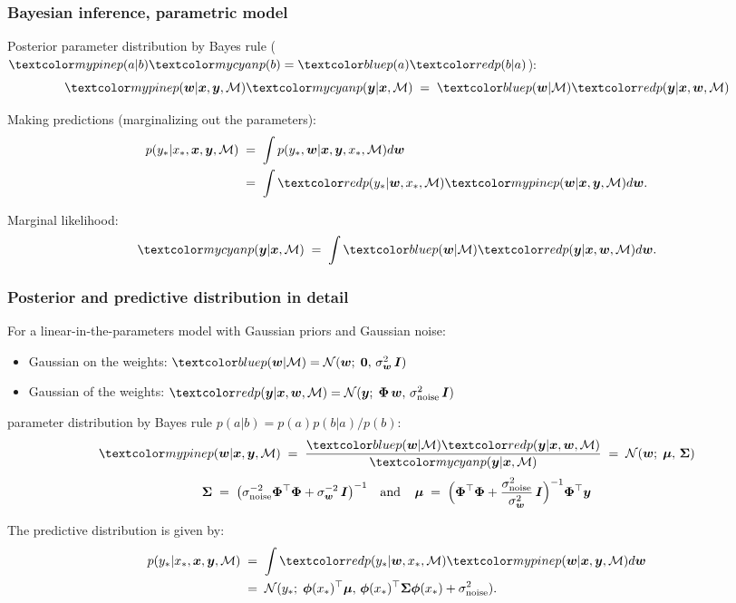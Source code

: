 \begin{frame}
\frametitle{Bayesian inference, parametric model}

Posterior parameter distribution by Bayes rule ($\Green{p(a|b)}\Cyan{p(b)}=\Blue{p(a)} \Red{p(b|a)}$):
\[
\Green{p(\bfw|\bfx,\bfy,\mathcal{M})}\Cyan{p(\bfy|\bfx,\mathcal{M})}
\;=\;\Blue{p(\bfw|\mathcal{M})}\Red{p(\bfy|\bfx,\bfw,\mathcal{M})}
\]

Making predictions (marginalizing out the parameters):
\[
\begin{split}
p(y_*|x_*,\bfx, \bfy,\mathcal{M})\;&=\;
\int p(y_*,\bfw|\bfx, \bfy, x_*, \mathcal{M})d\bfw\\
&=\;\int \Red{p(y_*|\bfw,x_*,\mathcal{M})}\Green{p(\bfw|\bfx,\bfy,\mathcal{M})}d\bfw.
\end{split}
\]

Marginal likelihood:
\[
\Cyan{p(\bfy|\bfx,\mathcal{M})}\;=\;
\int \Blue{p(\bfw|\mathcal{M})}  \Red{p(\bfy|\bfx,\bfw,\mathcal{M})}  d\bfw.
\]
\end{frame}


\begin{frame}
\frametitle{Posterior and predictive distribution in detail}

For a linear-in-the-parameters model with Gaussian priors and Gaussian noise:
\begin{itemize}
\item Gaussian  on the weights: 
$\Blue{p(\bfw|\mathcal{M})}=\N(\bfw;\;\mathbf{0},\,\sigma_{\bm w}^2\,\bfI)$
\item Gaussian  of the weights:
$\Red{p(\bfy|\bfx,\bfw,\mathcal{M}})=\N(\bfy;\;\bPhi\,\bfw,\,\sigma_\mathrm{noise}^2\,\bfI)$
\end{itemize}

 parameter distribution by Bayes rule $p(a|b)=p(a)p(b|a)/p(b)$:
\[
\Green{p(\bfw|\bfx,\bfy,\mathcal{M})}\;=\;\frac{\Blue{p(\bfw|\mathcal{M})}
\Red{p(\bfy|\bfx,\bfw,\mathcal{M})}}{\Cyan{p(\bfy|\bfx,\mathcal{M})}}
\;=\; \N(\bfw;\;\bmu,\,\bSigma)
\]
\[
\boldsymbol{\Sigma}\;=\;\left(\sigma_\mathrm{noise}^{-2}\boldsymbol{\Phi}^\top\boldsymbol{\Phi}+\sigma_{\bm
    w}^{-2}\,\bm I\right)^{-1}
\mathrm{\; \; \; and \; \; \; \; }
{\boldsymbol{\mu}}\;=\;
\Big(\boldsymbol{\Phi}^\top\boldsymbol{\Phi}+\frac{\sigma_\mathrm{noise}^2}{\sigma_{\bm w}^2}\,\bm I\Big)^{-1}\boldsymbol{\Phi}^\top\bm y
\]

The predictive distribution is given by:
\[
\begin{split}
p(y_*|x_*,\bfx, \bfy,\mathcal{M})\;&=\;\int
\Red{p(y_*|\bfw,x_*,\mathcal{M})}\Green{p(\bfw|\bfx, \bfy,\mathcal{M})}d\bfw\\
&=\;\N(y_*;\; \bphi(x_*)^\top\bmu,\,\bphi(x_*)^\top\bSigma\bphi(x_*)+\sigma_\mathrm{noise}^2).
\end{split}
\]
\end{frame}


